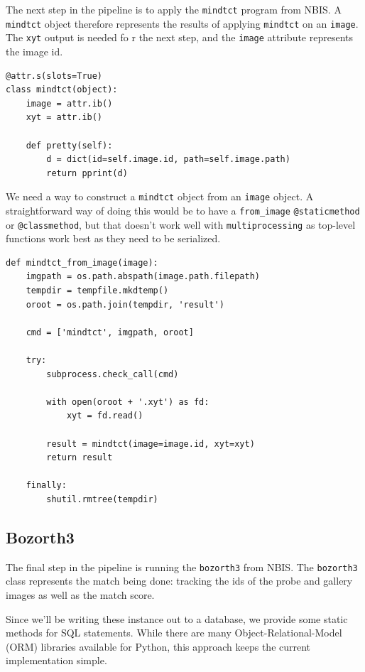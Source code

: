 The next step in the pipeline is to apply the \texttt{mindtct} program
from NBIS. A \texttt{mindtct} object therefore represents the results of
applying \texttt{mindtct} on an \texttt{image}. The \texttt{xyt} output
is needed fo r the next step, and the \texttt{image} attribute
represents the image id.

\begin{lstlisting}
@attr.s(slots=True)
class mindtct(object):
    image = attr.ib()
    xyt = attr.ib()

    def pretty(self):
        d = dict(id=self.image.id, path=self.image.path)
        return pprint(d)
\end{lstlisting}

We need a way to construct a \texttt{mindtct} object from an
\texttt{image} object. A straightforward way of doing this would be to
have a \texttt{from\_image} \texttt{@staticmethod} or
\texttt{@classmethod}, but that doesn't work well with
\texttt{multiprocessing} as top-level functions work best as they need
to be serialized.

\begin{lstlisting}
def mindtct_from_image(image):
    imgpath = os.path.abspath(image.path.filepath)
    tempdir = tempfile.mkdtemp()
    oroot = os.path.join(tempdir, 'result')

    cmd = ['mindtct', imgpath, oroot]

    try:
        subprocess.check_call(cmd)

        with open(oroot + '.xyt') as fd:
            xyt = fd.read()

        result = mindtct(image=image.id, xyt=xyt)
        return result

    finally:
        shutil.rmtree(tempdir)
\end{lstlisting}

\subsection{Bozorth3}\label{bozorth3}

The final step in the pipeline is running the \texttt{bozorth3} from
NBIS. The \texttt{bozorth3} class represents the match being done:
tracking the ids of the probe and gallery images as well as the match
score.

Since we'll be writing these instance out to a database, we provide some
static methods for SQL statements. While there are many
Object-Relational-Model (ORM) libraries available for Python, this
approach keeps the current implementation simple.

